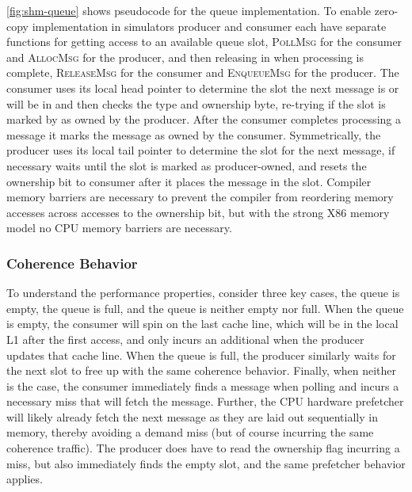 \autoref{fig:shm-queue} shows pseudocode for the \sysname queue implementation.
To enable zero-copy implementation in simulators producer and consumer each have
separate functions for getting access to an available queue slot,
\textsc{PollMsg} for the consumer and \textsc{AllocMsg} for the producer, and
then releasing in when processing is complete, \textsc{ReleaseMsg} for the
consumer and \textsc{EnqueueMsg} for the producer.
The consumer uses its local head pointer to determine the slot the next message
is or will be in and then checks the type and ownership byte, re-trying if the
slot is marked by as owned by the producer.
After the consumer completes processing a message it marks the message as owned
by the consumer.
Symmetrically, the producer uses its local tail pointer to determine the slot
for the next message, if necessary waits until the slot is marked as
producer-owned, and resets the ownership bit to consumer after it places the
message in the slot.
Compiler memory barriers are necessary to prevent the compiler from reordering
memory accesses across accesses to the ownership bit, but with the strong X86
memory model no CPU memory barriers are necessary.

\subsubsection{Coherence Behavior}
To understand the performance properties, consider three key cases,
the queue is empty, the queue is full, and the queue is neither empty
nor full.
%
When the queue is empty, the consumer will spin on the last cache
line, which will be in the local L1 after the first access, and only
incurs an additional when the producer updates that cache line.
%
When the queue is full, the producer similarly waits for the next slot
to free up with the same coherence behavior.
%
Finally, when neither is the case, the consumer immediately finds a
message when polling and incurs a necessary miss that will fetch the
message.
Further, the CPU hardware prefetcher will likely already fetch the
next message as they are laid out sequentially in memory, thereby
avoiding a demand miss (but of course incurring the same coherence
traffic).
The producer does have to read the ownership flag incurring a miss,
but also immediately finds the empty slot, and the same prefetcher
behavior applies.


